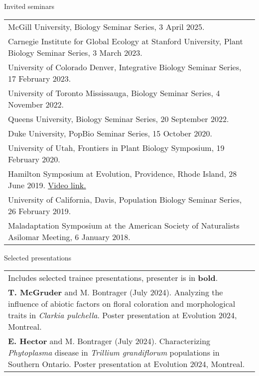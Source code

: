 \documentclass[letterpaper,11pt,oneside]{article}
\begin{document}
\noindent\Large{Invited seminars} 

\normalsize
\medskip

\def\arraystretch{1.3}
\noindent \begin{tabular}{@{} >{\raggedright\arraybackslash}p{17.2cm}}
McGill University, Biology Seminar Series, 3 April 2025. \\
Carnegie Institute for Global Ecology at Stanford University, Plant Biology Seminar Series, 3 March 2023.\\
University of Colorado Denver, Integrative Biology Seminar Series, 17 February 2023.\\
University of Toronto Mississauga, Biology Seminar Series, 4 November 2022.\\ 
Queens University, Biology Seminar Series, 20 September 2022.\\
Duke University, PopBio Seminar Series, 15 October 2020.\\
University of Utah, Frontiers in Plant Biology Symposium, 19 February 2020.\\
Hamilton Symposium at Evolution, Providence, Rhode Island, 28 June 2019. \href{https://www.youtube.com/watch?v=UeK_zYEfVyA}{Video link.} \\
University of California, Davis, Population Biology Seminar Series, 26 February 2019. \\
Maladaptation Symposium at the American Society of Naturalists Asilomar Meeting, 6 January 2018.
\end{tabular}
\bigskip



\newpage



\noindent\Large{Selected presentations}  
\normalsize
\medskip

\def\arraystretch{1.4}
\noindent \begin{tabular}{@{} >{\raggedright\arraybackslash}p{17.2cm}}
Includes selected trainee presentations, presenter is in \textbf{bold}. \\
\hangindent=5mm\textbf{T. McGruder} and M. Bontrager (July 2024). Analyzing the influence of abiotic factors on floral coloration and morphological traits in \textit{Clarkia pulchella}. Poster presentation at Evolution 2024, Montreal. \\
\hangindent=5mm\textbf{E. Hector} and M. Bontrager (July 2024). Characterizing \textit{Phytoplasma} disease in \textit{Trillium grandiflorum} populations in Southern Ontario. Poster presentation at Evolution 2024, Montreal. \\
\end{tabular}
\end{document}
